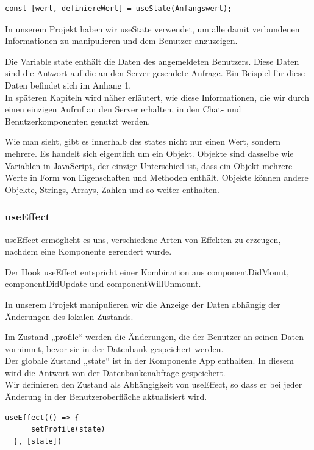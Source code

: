 \begin{lstlisting}
const [wert, definiereWert] = useState(Anfangswert);
\end{lstlisting}

In unserem Projekt haben wir useState verwendet, um alle damit verbundenen Informationen zu manipulieren und dem Benutzer anzuzeigen.

Die Variable state enthält die Daten des angemeldeten Benutzers.
Diese Daten sind die Antwort auf die an den Server gesendete Anfrage.
Ein Beispiel für diese Daten befindet sich im Anhang 1.
\\
In späteren Kapiteln wird näher erläutert, wie diese Informationen, die wir durch einen einzigen Aufruf an den Server erhalten, in den Chat- und Benutzerkomponenten genutzt werden.

Wie man sieht, gibt es innerhalb des states nicht nur einen Wert, sondern mehrere.
Es handelt sich eigentlich um ein Objekt. Objekte sind dasselbe wie Variablen in JavaScript, der einzige Unterschied ist, dass ein Objekt mehrere Werte in Form von Eigenschaften und Methoden enthält.
Objekte können andere Objekte, Strings, Arrays, Zahlen und so weiter enthalten.
\newpage

\subsubsection{useEffect}
useEffect ermöglicht es uns, verschiedene Arten von Effekten zu erzeugen, nachdem eine Komponente gerendert wurde.
\\
\begin{flushleft}
  Der Hook useEffect entspricht einer Kombination aus componentDidMount, componentDidUpdate und componentWillUnmount.

  In unserem Projekt manipulieren wir die Anzeige der Daten abhängig der Änderungen des lokalen Zustands.
\end{flushleft}

Im Zustand „profile“ werden die Änderungen, die der Benutzer an seinen Daten vornimmt, bevor sie in der Datenbank gespeichert werden.
\\
Der globale Zustand „state“ ist in der Komponente App enthalten.
In diesem wird die Antwort von der Datenbankenabfrage gespeichert.
\\
Wir definieren den Zustand als Abhängigkeit von useEffect, so dass er bei jeder Änderung in der Benutzeroberfläche aktualisiert wird.
\\
\begin{lstlisting}
useEffect(() => { 
      setProfile(state)      
  }, [state])           
\end{lstlisting}

